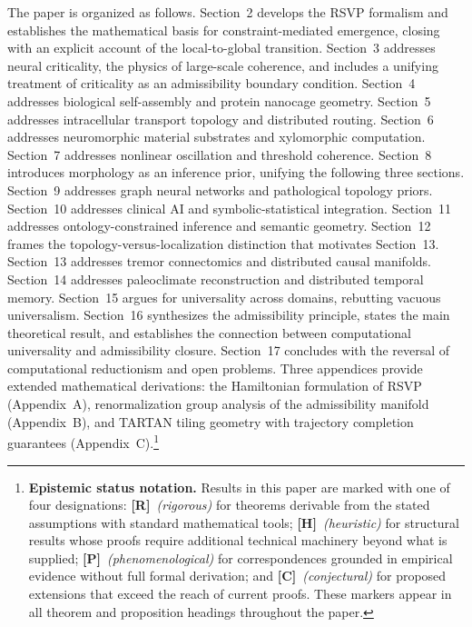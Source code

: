 \documentclass[11pt, oneside]{article}
\numberwithin{equation}{section}
\newcommand{\ClaimR}{\textcolor{rsvpblue}{\textbf{[R]}}}
\newcommand{\ClaimH}{\textcolor{rsvpgray}{\textbf{[H]}}}
\newcommand{\ClaimP}{\textcolor{rsvpgray!70}{\textbf{[P]}}}
\newcommand{\ClaimC}{\textcolor{rsvpgray!50}{\textbf{[C]}}}
\theoremstyle{rsvpstyle}
\theoremstyle{remark}
\begin{document}
The paper is organized as follows. Section~2 develops the RSVP formalism and establishes
the mathematical basis for constraint-mediated emergence, closing with an explicit
account of the local-to-global transition. Section~3 addresses neural criticality,
the physics of large-scale coherence, and includes a unifying treatment of criticality
as an admissibility boundary condition. Section~4 addresses biological self-assembly
and protein nanocage geometry. Section~5 addresses intracellular transport topology and
distributed routing. Section~6 addresses neuromorphic material substrates and xylomorphic
computation. Section~7 addresses nonlinear oscillation and threshold coherence.
Section~8 introduces morphology as an inference prior, unifying the following three
sections. Section~9 addresses graph neural networks and pathological topology priors.
Section~10 addresses clinical AI and symbolic-statistical integration. Section~11
addresses ontology-constrained inference and semantic geometry. Section~12 frames the
topology-versus-localization distinction that motivates Section~13. Section~13 addresses
tremor connectomics and distributed causal manifolds. Section~14 addresses paleoclimate
reconstruction and distributed temporal memory. Section~15 argues for universality
across domains, rebutting vacuous universalism. Section~16 synthesizes the admissibility
principle, states the main theoretical result, and establishes the connection between
computational universality and admissibility closure. Section~17 concludes with the reversal
of computational reductionism and open problems. Three appendices provide extended
mathematical derivations: the Hamiltonian formulation of RSVP (Appendix~A),
renormalization group analysis of the admissibility manifold (Appendix~B), and TARTAN
tiling geometry with trajectory completion guarantees (Appendix~C).\footnote{%
\textbf{Epistemic status notation.} Results in this paper are marked with one of four
designations: \ClaimR\ \textit{(rigorous)} for theorems derivable from the stated
assumptions with standard mathematical tools; \ClaimH\ \textit{(heuristic)} for
structural results whose proofs require additional technical machinery beyond what
is supplied; \ClaimP\ \textit{(phenomenological)} for correspondences grounded in
empirical evidence without full formal derivation; and \ClaimC\ \textit{(conjectural)}
for proposed extensions that exceed the reach of current proofs. These markers appear
in all theorem and proposition headings throughout the paper.}

\end{document}
